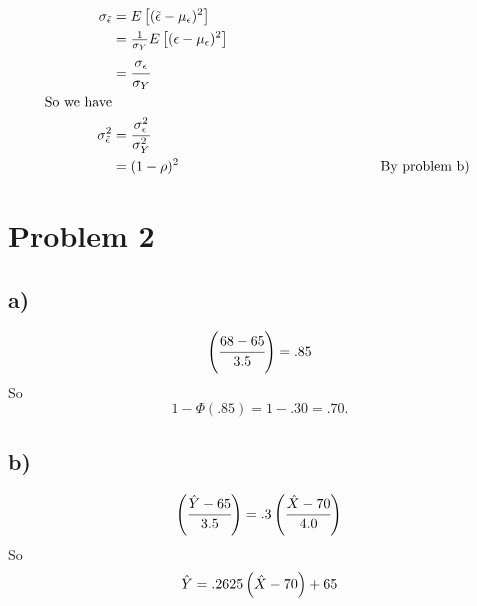 \documentclass[11pt]{article}
\begin{document}
\begin{align*}

  \sigma_{\tilde{\epsilon}} &= E \left[ (\tilde{\epsilon} - \mu_{\epsilon})^{2} \right]\\

  \quad &= \tfrac{1}{\sigma_{Y}}  E \left[ (\epsilon - \mu_{\epsilon})^{2} \right]\\

  \quad &= \cfrac{\sigma_{\epsilon}}{\sigma_{Y}}\\

  \text{So we have}\\
  
  \sigma^{2}_{\tilde{\epsilon}} &= \cfrac{\sigma^{2}_{\epsilon}}{\sigma^{2}_{Y}}\\

  \quad &= (1 - \rho)^{2}   \hspace{2in}\text{By problem b) }\\


\end{align*}

\section*{Problem 2}
\label{sec:org9d85282}
\subsection*{a)}
\label{sec:org3e28e9a}
\begin{equation*}
  \left( \cfrac{68 - 65}{3.5} \right) = .85\\

\end{equation*}
So $$1 - \Phi(.85) = 1 - .30 = .70. $$

\subsection*{b)}
\label{sec:orgc51dfb1}
\begin{equation*}
  \left( \cfrac{\hat{Y} - 65}{3.5} \right) = .3 \left( \cfrac{\hat{X} - 70}{4.0} \right)\\
  
\end{equation*}
So
\begin{equation*}
  \hat{Y} = .2625\left( \hat{X} - 70 \right) + 65\\
  
\end{equation*}
\end{document}
